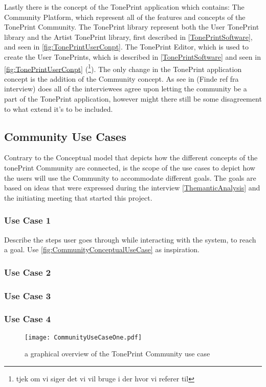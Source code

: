 Lastly there is the concept of the TonePrint application which contains: The Community Platform, which represent all of the features and concepts of the TonePrint Community. The TonePrint library represent both the User TonePrint library and the Artist TonePrint library, first described in \autoref{TonePrintSoftware}, and seen in \autoref{fig:TonePrintUserConpt}. The TonePrint Editor, which is used to create the User TonePrints, which is described in \autoref{TonePrintSoftware} and seen in \autoref{fig:TonePrintUserConpt} (\footnote{tjek om vi siger det vi vil bruge i der hvor vi referer til}). The only change in the TonePrint application concept is the addition of the Community concept. As see in (Finde ref fra interview) does all of the interviewees agree upon letting the community be a part of the TonePrint application, however might there still be some disagreement to what extend it's to be included. 

\subsection{Community Use Cases}
\label{CommunityUseCases}
Contrary to the Conceptual model that depicts how the different concepts of the tonePrint Community are connected, is the scope of the use cases to depict how the users will use the Community to accommodate different goals. The goals are based on ideas that were expressed during the interview \autoref{ThemanticAnalysis} and the initiating meeting that started this project. 

\subsubsection{Use Case 1}
\label{UseCase1}
Describe the steps user goes through while interacting with the system, to reach a goal. Use \autoref{fig:CommunityConceptualUseCase} as inspiration.

\subsubsection{Use Case 2}
\label{UseCase2}

\subsubsection{Use Case 3}
\label{UseCase3}

\subsubsection{Use Case 4}
\label{UseCase4}


\begin{figure}
	\centering
	\texttt{[image: CommunityUseCaseOne.pdf]}
	\caption{a graphical overview of the TonePrint Community use case}
	\label{fig:CommunityConceptualUseCase}
\end{figure}
